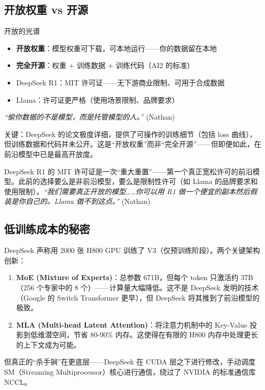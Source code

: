 \subsection{开放权重 vs 开源}

\begin{knowledgebox}{开放的光谱}
\begin{itemize}
    \item \textbf{开放权重}：模型权重可下载，可本地运行——你的数据留在本地
    \item \textbf{完全开源}：权重 + 训练数据 + 训练代码（AI2 的标准）
    \item DeepSeek R1：MIT 许可证——无下游商业限制、可用于合成数据
    \item Llama：许可证更严格（使用场景限制、品牌要求）
\end{itemize}

\textit{``偷你数据的不是模型，而是托管模型的人。''} (Nathan)

关键：DeepSeek 的论文极度详细，提供了可操作的训练细节（包括 loss 曲线），但训练数据和代码并未公开。这是``开放权重''而非``完全开源''——但即便如此，在前沿模型中已是最高开放度。

DeepSeek R1 的 MIT 许可证是一次``重大重置''——第一个真正宽松许可的前沿模型。此前的选择要么是非前沿模型，要么是限制性许可（如 Llama 的品牌要求和使用限制）。\textit{``我们需要真正开放的模型……你可以用 R1 做一个便宜的副本然后假装是你自己的。Llama 做不到这点。''} (Nathan)
\end{knowledgebox}

\subsection{低训练成本的秘密}

DeepSeek 声称用 2000 张 H800 GPU 训练了 V3（仅预训练阶段）。两个关键架构创新：

\begin{enumerate}
    \item \textbf{MoE (Mixture of Experts)}：总参数 671B，但每个 token 只激活约 37B（256 个专家中的 8 个）——计算量大幅降低。这不是 DeepSeek 发明的技术（Google 的 Switch Transformer 更早），但 DeepSeek 将其推到了前沿模型的极致。
    \item \textbf{MLA (Multi-head Latent Attention)}：将注意力机制中的 Key-Value 投影到低维潜空间，节省 80-90\% 内存。这使得在有限的 H800 内存中处理更长的上下文成为可能。
\end{enumerate}

但真正的``杀手锏''在更底层——DeepSeek 在 CUDA 层之下进行修改，手动调度 SM（Streaming Multiprocessor）核心进行通信，绕过了 NVIDIA 的标准通信库 NCCL。

